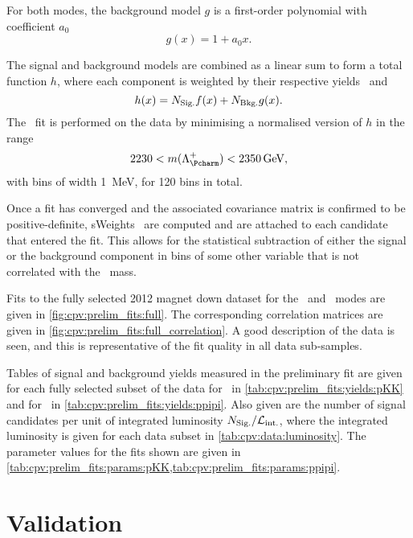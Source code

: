 For both modes, the background model $g$ is a first-order polynomial with 
coefficient $a_{0}$
\begin{equation}
  g(x) = 1 + a_{0}x.
  \label{eqn:cpv:prelim_fits:bkg_model}
\end{equation}

The signal and background models are combined as a linear sum to form a total 
function $h$, where each component is weighted by their respective yields 
\nsig\ and \nbkg
\begin{equation}
  h(x) = N_{\text{Sig.}} f(x) + N_{\text{Bkg.}} g(x).
\end{equation}
The \chisq\ fit is performed on the data by minimising a normalised version of 
$h$ in the range
\begin{equation}
  2230 < m(\PLambdac) < \SI{2350}{\GeV},
\end{equation}
with bins of width \SI{1}{\MeV}, for 120 bins in total.

Once a fit has converged and the associated covariance matrix is confirmed to 
be positive-definite, sWeights~\cite{Pivk:2004ty} are computed and are attached 
to each candidate that entered the fit.
This allows for the statistical subtraction of either the signal or the 
background component in bins of some other variable that is not correlated with 
the \PLambdac\ mass.

Fits to the fully selected 2012 magnet down dataset for the \pKK\ and \ppipi\ 
modes are given in \cref{fig:cpv:prelim_fits:full}.
The corresponding correlation matrices are given in 
\cref{fig:cpv:prelim_fits:full_correlation}.
A good description of the data is seen, and this is representative of the fit 
quality in all data sub-samples.

Tables of signal and background yields measured in the preliminary fit are 
given for each fully selected subset of the data for \pKK\ in 
\cref{tab:cpv:prelim_fits:yields:pKK} and for \ppipi\ in 
\cref{tab:cpv:prelim_fits:yields:ppipi}.
Also given are the number of signal candidates per unit of integrated 
luminosity $N_{\text{Sig.}}/\mathcal{L}_{\textnormal{int.}}$, where the integrated luminosity is given for each 
data subset in \cref{tab:cpv:data:luminosity}.
The parameter values for the fits shown are given in 
\cref{tab:cpv:prelim_fits:params:pKK,tab:cpv:prelim_fits:params:ppipi}.

\section{Validation}
\label{chap:cpv:prelim_fits:validation}

